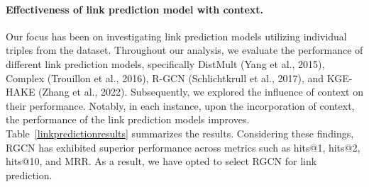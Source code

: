 \documentclass[letterpaper]{article} %
\begin{document}
\paragraph{\textbf{Effectiveness of link prediction model with context.}} Our focus has been on investigating link prediction models utilizing individual triples from the dataset. Throughout our analysis, we evaluate the performance of different link prediction models, specifically DistMult (Yang et al., 2015), Complex (Trouillon et al., 2016), R-GCN (Schlichtkrull et al., 2017), and KGE-HAKE (Zhang et al., 2022). Subsequently, we explored the influence of context on their performance. Notably, in each instance, upon the incorporation of context, the performance of the link prediction models improves.
Table~\ref{linkpredictionresults} summarizes the results. Considering these findings, RGCN has exhibited superior performance across metrics such as hits@1, hits@2, hits@10, and MRR. As a result, we have opted to select RGCN for link prediction.
\end{document}
